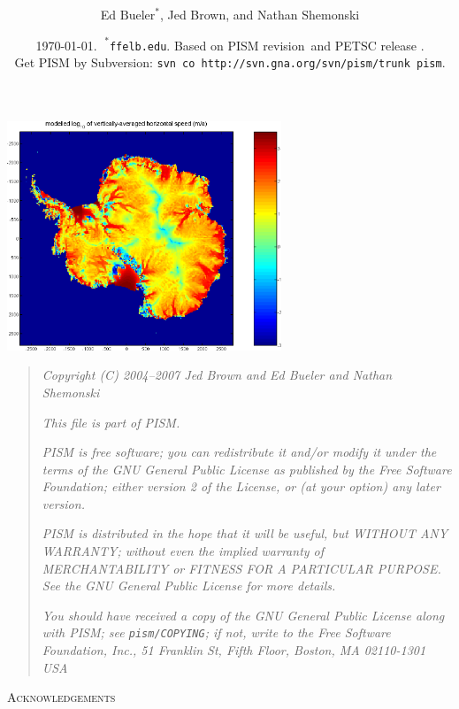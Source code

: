 \documentclass[11pt,final]{amsart}
\title[PISM User's Manual]{\protect{\Large PISM, a \underline{P}arallel \underline{I}ce \underline{S}heet \underline{M}odel:\normalsize} \\ \protect{\Large \bigskip User's Manual and Reference\normalsize}}
\author[]{Ed $\text{Bueler}^\ast$, Jed Brown, and Nathan Shemonski}
\date{\today.  $\phantom{|}^\ast$\texttt{ffelb\@@uaf.edu}.  Based on PISM revision \PISMREV\,and PETSC release \PETSCREV.  \\\tiny Get PISM by Subversion: \texttt{svn co http://svn.gna.org/svn/pism/trunk pism}.}
\newcommand{\normalspacing}{\renewcommand{\baselinestretch}{1.1}\tiny\normalsize}
\newcommand{\tablespacing}{\renewcommand{\baselinestretch}{1.0}\tiny\normalsize}
\begin{document}
\maketitle
\thispagestyle{empty}

\vspace{2.0in}
\begin{center}
\includegraphics[height=2.7in,keepaspectratio=true]{figs/ant153k_mv100_speed}
\end{center}

\newpage
\phantom{bob}
\vspace{2in}
\begin{quote}
\textsl{Copyright (C) 2004--2007 Jed Brown and Ed Bueler and Nathan Shemonski}
\medskip

\noindent \textsl{This file is part of PISM.}
\medskip

\noindent \textsl{PISM is free software; you can redistribute it and/or modify it under the terms of the GNU General Public License as published by the Free Software Foundation; either version 2 of the License, or (at your option) any later version.}
\medskip

\noindent \textsl{PISM is distributed in the hope that it will be useful, but WITHOUT ANY WARRANTY; without even the implied warranty of MERCHANTABILITY or FITNESS FOR A PARTICULAR PURPOSE.  See the GNU General Public License for more details.}
\medskip

\noindent \textsl{You should have received a copy of the GNU General Public License along with PISM; see \emph{\texttt{pism/COPYING}}; if not, write to the Free Software Foundation, Inc., 51 Franklin St, Fifth Floor, Boston, MA  02110-1301 USA}
\end{quote}
\vspace{1in}
\normalspacing

\centerline{\textsc{Acknowledgements}}
\bigskip
\end{document}
